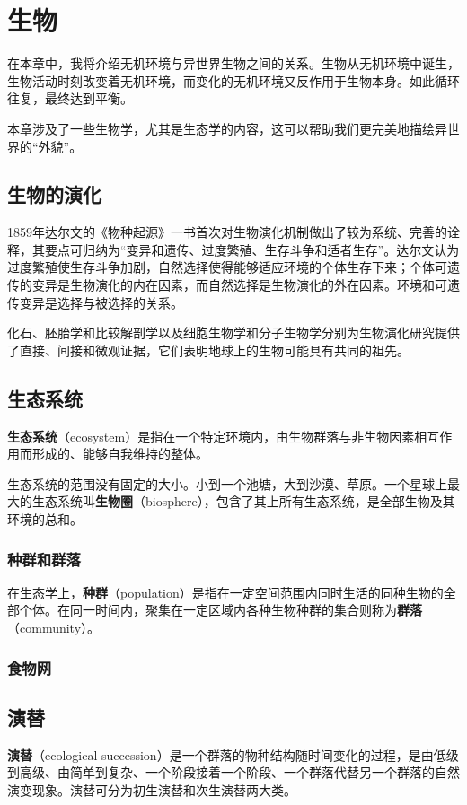 \chapter{生物}
在本章中，我将介绍无机环境与异世界生物之间的关系。生物从无机环境中诞生，生物活动时刻改变着无机环境，而变化的无机环境又反作用于生物本身。如此循环往复，最终达到平衡。

本章涉及了一些生物学，尤其是生态学的内容，这可以帮助我们更完美地描绘异世界的“外貌”。

\section{生物的演化}
1859年达尔文的《物种起源》一书首次对生物演化机制做出了较为系统、完善的诠释，其要点可归纳为“变异和遗传、过度繁殖、生存斗争和适者生存”。达尔文认为过度繁殖使生存斗争加剧，自然选择使得能够适应环境的个体生存下来；个体可遗传的变异是生物演化的内在因素，而自然选择是生物演化的外在因素。环境和可遗传变异是选择与被选择的关系。

化石、胚胎学和比较解剖学以及细胞生物学和分子生物学分别为生物演化研究提供了直接、间接和微观证据，它们表明地球上的生物可能具有共同的祖先。

\section{生态系统}
\textbf{生态系统}（ecosystem）是指在一个特定环境内，由生物群落与非生物因素相互作用而形成的、能够自我维持的整体。

生态系统的范围没有固定的大小。小到一个池塘，大到沙漠、草原。一个星球上最大的生态系统叫\textbf{生物圈}（biosphere），包含了其上所有生态系统，是全部生物及其环境的总和。

\subsection{种群和群落}
在生态学上，\textbf{种群}（population）是指在一定空间范围内同时生活的同种生物的全部个体。在同一时间内，聚集在一定区域内各种生物种群的集合则称为\textbf{群落}（community）。

\subsection{食物网}

\section{演替}
\textbf{演替}（ecological succession）是一个群落的物种结构随时间变化的过程，是由低级到高级、由简单到复杂、一个阶段接着一个阶段、一个群落代替另一个群落的自然演变现象。演替可分为初生演替和次生演替两大类。

